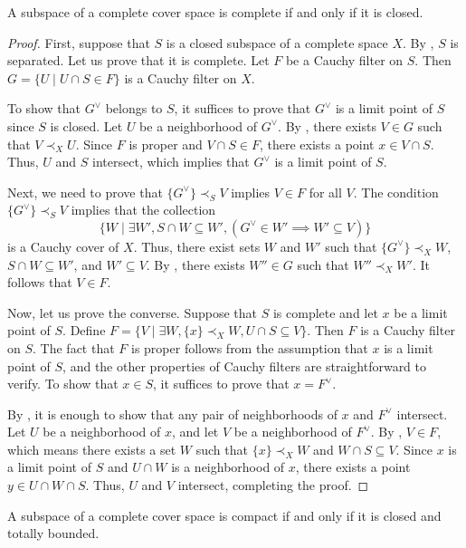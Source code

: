 \documentclass[reqno]{amsart}
\theoremstyle{definition}
\theoremstyle{remark}
\numberwithin{figure}{section}
\newcommand{\rb}{\prec}
\begin{document}
\begin{prop}
A subspace of a complete cover space is complete if and only if it is closed.
\end{prop}
\begin{proof}
First, suppose that $S$ is a closed subspace of a complete space $X$.
By , $S$ is separated.
Let us prove that it is complete.
Let $F$ be a Cauchy filter on $S$.
Then $G = \{ U \mid U \cap S \in F \}$ is a Cauchy filter on $X$.

To show that $G^\vee$ belongs to $S$, it suffices to prove that $G^\vee$ is a limit point of $S$ since $S$ is closed.
Let $U$ be a neighborhood of $G^\vee$.
By , there exists $V \in G$ such that $V \rb_X U$.
Since $F$ is proper and $V \cap S \in F$, there exists a point $x \in V \cap S$.
Thus, $U$ and $S$ intersect, which implies that $G^\vee$ is a limit point of $S$.

Next, we need to prove that $\{ G^\vee \} \rb_S V$ implies $V \in F$ for all $V$.
The condition $\{ G^\vee \} \rb_S V$ implies that the collection
\[ \{ W \mid \exists W', S \cap W \subseteq W', (G^\vee \in W' \implies W' \subseteq V) \} \]
is a Cauchy cover of $X$.
Thus, there exist sets $W$ and $W'$ such that $\{ G^\vee \} \rb_X W$, $S \cap W \subseteq W'$, and $W' \subseteq V$.
By , there exists $W'' \in G$ such that $W'' \rb_X W'$.
It follows that $V \in F$.

Now, let us prove the converse.
Suppose that $S$ is complete and let $x$ be a limit point of $S$.
Define $F = \{ V \mid \exists W, \{ x \} \rb_X W, U \cap S \subseteq V \}$.
Then $F$ is a Cauchy filter on $S$.
The fact that $F$ is proper follows from the assumption that $x$ is a limit point of $S$, and the other properties of Cauchy filters are straightforward to verify.
To show that $x \in S$, it suffices to prove that $x = F^\vee$.

By , it is enough to show that any pair of neighborhoods of $x$ and $F^\vee$ intersect.
Let $U$ be a neighborhood of $x$, and let $V$ be a neighborhood of $F^\vee$.
By , $V \in F$, which means there exists a set $W$ such that $\{ x \} \rb_X W$ and $W \cap S \subseteq V$.
Since $x$ is a limit point of $S$ and $U \cap W$ is a neighborhood of $x$, there exists a point $y \in U \cap W \cap S$.
Thus, $U$ and $V$ intersect, completing the proof.
\end{proof}

\begin{cor}
A subspace of a complete cover space is compact if and only if it is closed and totally bounded.
\end{cor}
\end{document}
